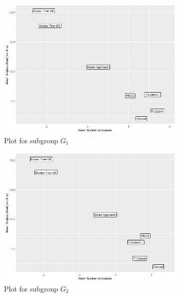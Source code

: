 \begin{figure}[!htb]
    \centering
    \captionsetup{justification=centering}
     \begin{subfigure}[b]{0.45\textwidth}
        \includegraphics[width=\textwidth]{images/sim_study/meanNbVsOffset_scale_4.png}
		\caption{Plot for subgroup $G_1$}
		\label{fig : meanNbVsOffset_G1}
    \end{subfigure}
    \begin{subfigure}[b]{0.45\textwidth}
		\includegraphics[width=\textwidth]{images/sim_study/meanNbVsOffset_scale_5.png}
		\caption{Plot for subgroup $G_2$}
		\label{fig : meanNbVsOffset_G2}
    \end{subfigure}  
    \begin{subfigure}[b]{0.45\textwidth}

\end{subfigure}
\end{figure}

